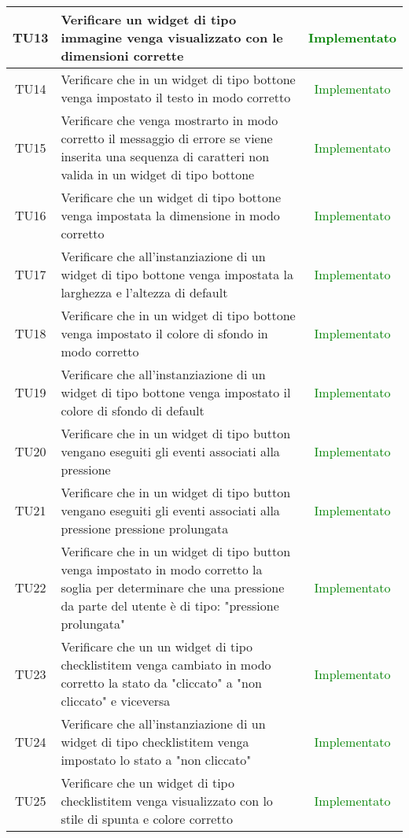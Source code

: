 \begin{center}
\begin{longtable}{|c|>{\centering}m{10cm}|c|}
		TU13 & Verificare un widget di tipo immagine venga visualizzato con le dimensioni corrette & \textcolor{Green}{Implementato}\\ \hline
		TU14 & Verificare che in un widget di tipo bottone venga impostato il testo in modo corretto & \textcolor{Green}{Implementato}\\ \hline
		TU15 & Verificare che venga mostrarto in modo corretto il messaggio di errore se viene inserita una sequenza di caratteri non valida in un widget di tipo bottone & \textcolor{Green}{Implementato}\\ \hline
		TU16 & Verificare che un widget di tipo bottone venga impostata la dimensione in modo corretto & \textcolor{Green}{Implementato}\\ \hline
		TU17 & Verificare che all'instanziazione di un widget di tipo bottone venga impostata la larghezza e l'altezza di default & \textcolor{Green}{Implementato}\\ \hline
		TU18 & Verificare che in un widget di tipo bottone venga impostato il colore di sfondo in modo corretto & \textcolor{Green}{Implementato}\\ \hline
		TU19 & Verificare che all'instanziazione di un widget di tipo bottone venga impostato il colore di sfondo di default & \textcolor{Green}{Implementato}\\ \hline
		TU20 & Verificare che in un widget di tipo button vengano eseguiti gli eventi associati alla pressione & \textcolor{Green}{Implementato}\\ \hline
		TU21 & Verificare che in un widget di tipo button vengano eseguiti gli eventi associati alla pressione pressione prolungata & \textcolor{Green}{Implementato}\\ \hline
		TU22 & Verificare che in un widget di tipo button venga impostato in modo corretto la soglia per determinare che una pressione da parte del utente è di tipo: "pressione prolungata" & \textcolor{Green}{Implementato}\\ \hline
		TU23 & Verificare che un un widget di tipo checklistitem venga cambiato in modo corretto la stato da "cliccato" a "non cliccato" e viceversa & \textcolor{Green}{Implementato}\\ \hline
		TU24 & Verificare che all'instanziazione di un widget di tipo checklistitem venga impostato lo stato a "non cliccato" & \textcolor{Green}{Implementato}\\ \hline
		TU25 & Verificare che un widget di tipo checklistitem venga visualizzato con lo stile di spunta e colore corretto & \textcolor{Green}{Implementato}\\ \hline

\end{longtable}
\end{center}

